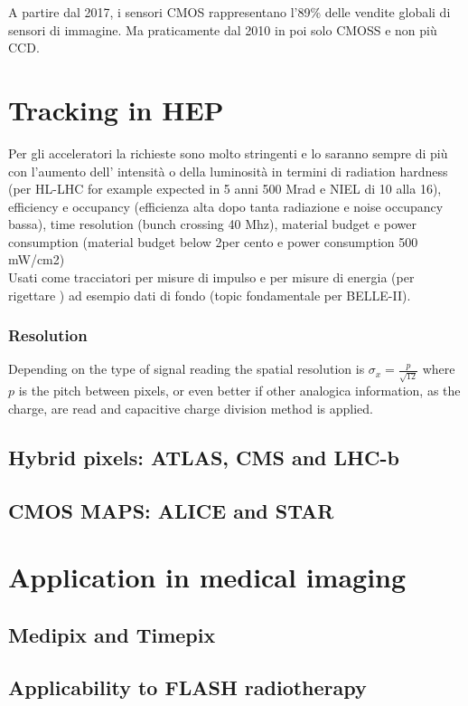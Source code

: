 A partire dal 2017, i sensori CMOS rappresentano l'89\% delle vendite globali di sensori di immagine. Ma praticamente dal 2010 in poi solo CMOSS e non più CCD.\\

\section{Tracking in HEP}
    Per gli acceleratori la richieste sono molto stringenti e lo saranno sempre di più con l'aumento dell' intensità o della luminosità in termini di radiation hardness (per HL-LHC for example expected in 5 anni 500 Mrad e NIEL di 10 alla 16), efficiency e occupancy (efficienza alta dopo tanta radiazione e noise occupancy bassa), time resolution (bunch crossing 40 Mhz), material budget e power consumption (material budget below 2per cento e power consumption 500 mW/cm2)\\
    Usati come tracciatori per misure di impulso e per misure di energia (per rigettare ) ad esempio dati di fondo (topic fondamentale per BELLE-II).

    \subsubsection{Resolution}
        Depending on the type of signal reading the spatial resolution is  $\sigma_x = \frac{p}{\sqrt{12}}$ where $p$ is the pitch between pixels, or even better if other 
        analogica information, as the charge, are read and capacitive charge division method is applied.

    \subsection{Hybrid pixels: ATLAS, CMS and LHC-b}
    \subsection{CMOS MAPS: ALICE and STAR}

\section{Application in medical imaging}
    \subsection{Medipix and Timepix}
    \subsection{Applicability to FLASH radiotherapy}